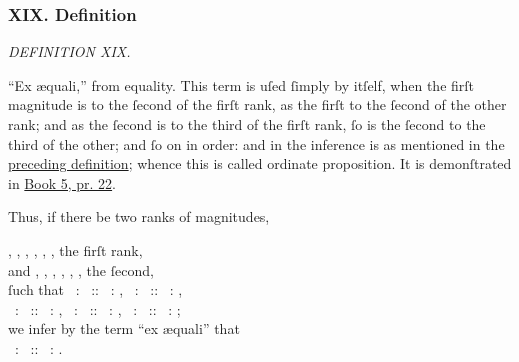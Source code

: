 \documentclass[11pt,preview]{standalone}
\begin{document}
\newcommand{\redA}{{\color{cred}{A}}}
\newcommand{\redB}{{\color{cred}{B}}}
\newcommand{\redL}{{\color{cred}{L}}}
\newcommand{\redM}{{\color{cred}{M}}}
\newcommand{\yellowC}{{\color{cyellow}{C}}}
\newcommand{\yellowD}{{\color{cyellow}{D}}}
\newcommand{\yellowN}{{\color{cyellow}{N}}}
\newcommand{\yellowO}{{\color{cyellow}{O}}}
\newcommand{\blueE}{{\color{cblue}{E}}}
\newcommand{\blueF}{{\color{cblue}{F}}}
\newcommand{\blueP}{{\color{cblue}{P}}}
\newcommand{\blueQ}{{\color{cblue}{Q}}}

\subsubsection{XIX. Definition}

\begin{minipage}{\textwidth}

    \begin{center}
        \textit{DEFINITION XIX.}\label{book5def19} \\
    \end{center}

    \hfill
\end{minipage}

\raggedright “Ex \ae quali,” from equality. This term is uſed ſimply by itſelf, when the firſt magnitude is to the ſecond of the firſt rank, as the firſt to the ſecond of the other rank; and as the ſecond is to the third of the firſt rank, ſo is the ſecond to the third of the other; and ſo on in order: and in the inference is as mentioned in the \hyperref[book5def18]{preceding definition}; whence this is called ordinate proposition. It is demonſtrated in \hyperref[book5pr22]{Book 5, pr. 22}.\\

\hfill

Thus, if there be two ranks of magnitudes,\\

\begin{center}
    \redA, \redB, \yellowC, \yellowD, \blueE, \blueF, the firſt rank,\\
    and \redL, \redM, \yellowN, \yellowO, \blueP, \blueQ, the ſecond,\\
    ſuch that \redA\ : \redB\ :: \redL\ : \redM, \redB\ : \yellowC\ :: \redM\ : \yellowN,\\
    \yellowC\ : \yellowD\ :: \yellowN\ : \yellowO, \yellowD\ : \blueE\ :: \yellowO\ : \blueP, \blueE\ : \blueF\ :: \blueP\ : \blueQ;\\
    we infer by the term “ex \ae quali” that\\
    \redA\ : \blueF\ :: \redL\ : \blueQ.
\end{center}
\end{document}
